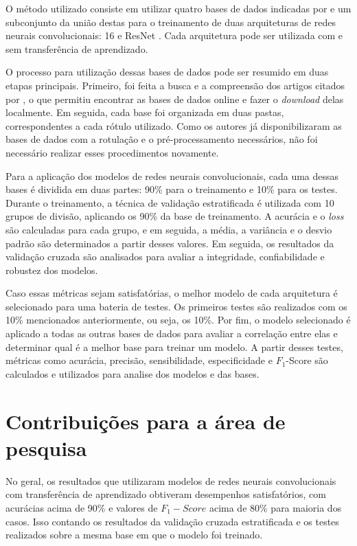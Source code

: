 O método utilizado consiste em utilizar quatro bases de dados indicadas por  e um subconjunto da união destas para o treinamento de duas arquiteturas de redes neurais convolucionais:  16 \cite{simonyan2014very} e ResNet \cite{he2016deep}.
Cada arquitetura pode ser utilizada com e sem transferência de aprendizado.

O processo para utilização dessas bases de dados pode ser resumido em duas etapas principais. 
Primeiro, foi feita a busca e a compreensão dos artigos citados por , o que permitiu encontrar as bases de dados online e fazer o \textit{download} delas localmente. 
Em seguida, cada base foi organizada em duas pastas, correspondentes a cada rótulo utilizado. 
Como os autores já disponibilizaram as bases de dados com a rotulação e o pré-processamento necessários, não foi necessário realizar esses procedimentos novamente.

Para a aplicação dos modelos de redes neurais convolucionais, cada uma dessas bases é dividida em duas partes: 90\% para o treinamento e 10\% para os testes. 
Durante o treinamento, a técnica de validação estratificada é utilizada com 10 grupos de divisão, aplicando os 90\% da base de treinamento. 
A acurácia e o \textit{loss} são calculadas para cada grupo, e em seguida, a média, a variância e o desvio padrão são determinados a partir desses valores.
Em seguida, os resultados da validação cruzada são analisados para avaliar a integridade, confiabilidade e robustez dos modelos.

Caso essas métricas sejam satisfatórias, o melhor modelo de cada arquitetura é selecionado para uma bateria de testes. 
Os primeiros testes são realizados com os 10\% mencionados anteriormente, ou seja, os 10\%. 
Por fim, o modelo selecionado é aplicado a todas as outras bases de dados para avaliar a correlação entre elas e determinar qual é a melhor base para treinar um modelo.
A partir desses testes, métricas como acurácia, precisão, sensibilidade, especificidade e $F_{1}$-Score são calculados e utilizados para analise dos modelos e das bases.


\section{Contribuições para a área de pesquisa}

No geral, os resultados que utilizaram modelos de redes neurais convolucionais com transferência de aprendizado obtiveram desempenhos satisfatórios, com acurácias acima de 90\% e valores de $F_{1}-Score$ acima de 80\% para maioria dos casos.
Isso contando os resultados da validação cruzada estratificada e os testes realizados sobre a mesma base em que o modelo foi treinado.

